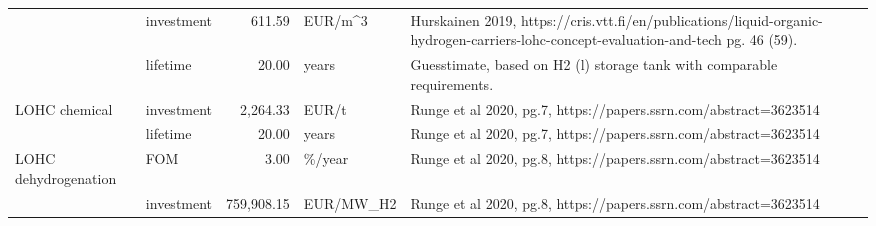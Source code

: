 \begin{longtable}{p{5cm}p{3cm}rp{3cm}p{11cm}}
                      & investment &         611.59 &                           EUR/m\textasciicircum 3 &                                                                                                                                                                                                  Hurskainen 2019, https://cris.vtt.fi/en/publications/liquid-organic-hydrogen-carriers-lohc-concept-evaluation-and-tech pg. 46 (59). \\
                      & lifetime &          20.00 &                             years &                                                                                                                                                                                                                                                              Guesstimate, based on H2 (l) storage tank with comparable requirements. \\
LOHC chemical & investment &       2,264.33 &                             EUR/t &                                                                                                                                                                                                                                                                     Runge et al 2020, pg.7, https://papers.ssrn.com/abstract=3623514 \\
                      & lifetime &          20.00 &                             years &                                                                                                                                                                                                                                                                     Runge et al 2020, pg.7, https://papers.ssrn.com/abstract=3623514 \\
LOHC dehydrogenation & FOM &           3.00 &                            \%/year &                                                                                                                                                                                                                                                                     Runge et al 2020, pg.8, https://papers.ssrn.com/abstract=3623514 \\
                      & investment &     759,908.15 &                         EUR/MW\_H2 &                                                                                                                                                                                                                                                                     Runge et al 2020, pg.8, https://papers.ssrn.com/abstract=3623514 \\

\end{longtable}
